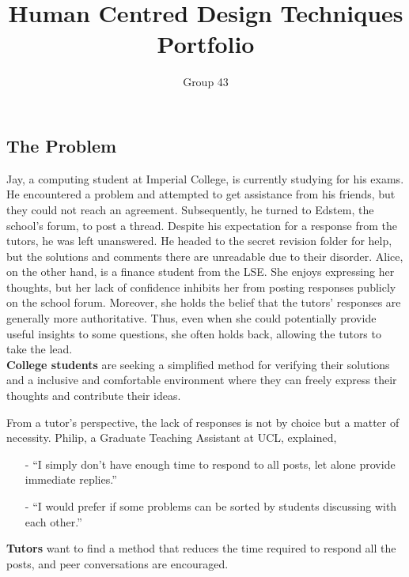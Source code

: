 \documentclass[a4paper]{article}
\begin{document}
    \title{
        \vspace{-3em}
        Human Centred Design Techniques Portfolio}
    \author{
        Group 43
    }
    \date{\vspace{-2em}}
    \maketitle

    \subsection*{The Problem}

    Jay, a computing student at Imperial College, is currently studying for his exams.
    He encountered a problem and attempted to get assistance from his friends, but they could not reach an agreement.
    Subsequently, he turned to Edstem, the school’s forum, to post a thread.
    Despite his expectation for a response from the tutors, he was left unanswered.
    He headed to the secret revision folder for help, but the solutions and comments there are unreadable due to their disorder.
    Alice, on the other hand, is a finance student from the LSE. She enjoys expressing her thoughts, but her lack of confidence inhibits her from posting responses publicly on the school forum.
    Moreover, she holds the belief that the tutors' responses are generally more authoritative.
    Thus, even when she could potentially provide useful insights to some questions, she often holds back, allowing the tutors to take the lead.\\
    \textbf{College students} are seeking a simplified method for verifying their solutions and a inclusive and comfortable environment where they can freely express their thoughts and contribute their ideas.


    From a tutor's perspective, the lack of responses is not by choice but a matter of necessity.
    Philip, a Graduate Teaching Assistant at UCL, explained,
    \begin{itemize}
        \item[-] ``I simply don't have enough time to respond to all posts, let alone provide immediate replies.''
        \item[-] ``I would prefer if some problems can be sorted by students discussing with each other.''
    \end{itemize}
    \textbf{Tutors} want to find a method that reduces the time required to respond all the posts, and peer conversations are encouraged.
\end{document}
